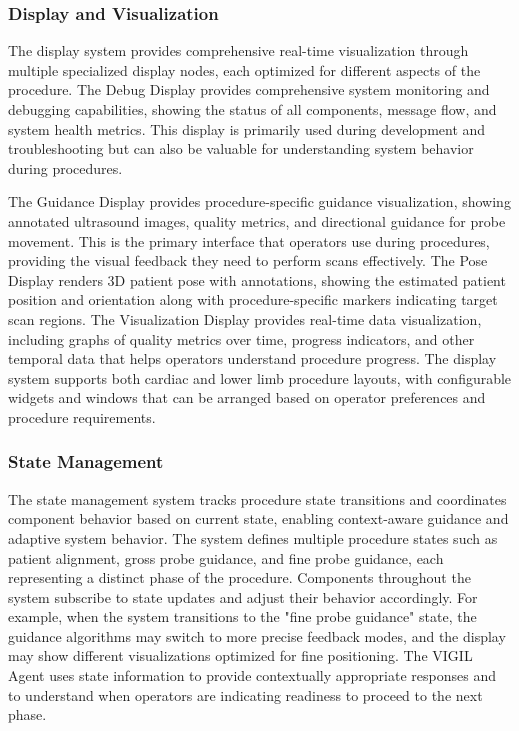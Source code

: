 \documentclass[12pt,a4paper]{article}
\begin{document}
\subsubsection{Display and Visualization}

The display system provides comprehensive real-time visualization through multiple specialized display nodes, each optimized for different aspects of the procedure. The Debug Display provides comprehensive system monitoring and debugging capabilities, showing the status of all components, message flow, and system health metrics. This display is primarily used during development and troubleshooting but can also be valuable for understanding system behavior during procedures.

The Guidance Display provides procedure-specific guidance visualization, showing annotated ultrasound images, quality metrics, and directional guidance for probe movement. This is the primary interface that operators use during procedures, providing the visual feedback they need to perform scans effectively. The Pose Display renders 3D patient pose with annotations, showing the estimated patient position and orientation along with procedure-specific markers indicating target scan regions. The Visualization Display provides real-time data visualization, including graphs of quality metrics over time, progress indicators, and other temporal data that helps operators understand procedure progress. The display system supports both cardiac and lower limb procedure layouts, with configurable widgets and windows that can be arranged based on operator preferences and procedure requirements.

\subsubsection{State Management}

The state management system tracks procedure state transitions and coordinates component behavior based on current state, enabling context-aware guidance and adaptive system behavior. The system defines multiple procedure states such as patient alignment, gross probe guidance, and fine probe guidance, each representing a distinct phase of the procedure. Components throughout the system subscribe to state updates and adjust their behavior accordingly. For example, when the system transitions to the "fine probe guidance" state, the guidance algorithms may switch to more precise feedback modes, and the display may show different visualizations optimized for fine positioning. The VIGIL Agent uses state information to provide contextually appropriate responses and to understand when operators are indicating readiness to proceed to the next phase.
\end{document}

